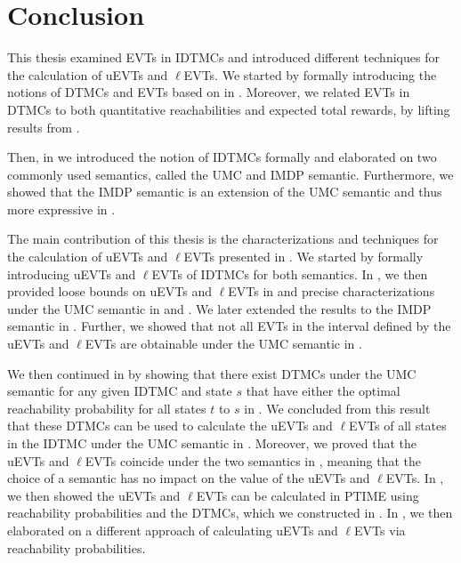 \chapter{Conclusion}
\label{ch:conclusion}
This thesis examined EVTs in IDTMCs and introduced different techniques for the calculation of uEVTs and $\ell$EVTs. We started by formally introducing the notions of DTMCs and EVTs based on \cite{Bibel,Computing_EVTs_Stationary_Distr_in_MCs_Mertens,KemenySnellBook} in . Moreover, we related EVTs in DTMCs to both quantitative reachabilities and expected total rewards, by lifting results from \cite{Baier_Relating_Reach_Prob,Computing_EVTs_Stationary_Distr_in_MCs_Mertens}.

Then, in  we introduced the notion of IDTMCs formally and elaborated on two commonly used semantics, called the UMC and IMDP semantic. Furthermore, we showed that the IMDP semantic is an extension of the UMC semantic and thus more expressive in .

The main contribution of this thesis is the characterizations and techniques for the calculation of uEVTs and $\ell$EVTs presented in . We started by formally introducing uEVTs and $\ell$EVTs of IDTMCs for both semantics. In , we then provided loose bounds on uEVTs and $\ell$EVTs in  and precise characterizations under the UMC semantic in  and . We later extended the results to the IMDP semantic in . Further, we showed that not all EVTs in the interval defined by the uEVTs and $\ell$EVTs are obtainable under the UMC semantic in . 

We then continued in  by showing that there exist DTMCs under the UMC semantic for any given IDTMC and state $s$ that have either the optimal reachability probability for all states $t$ to $s$ in . We concluded from this result that these DTMCs can be used to calculate the uEVTs and $\ell$EVTs of all states in the IDTMC under the UMC semantic in . Moreover, we proved that the uEVTs and $\ell$EVTs coincide under the two semantics in , meaning that the choice of a semantic has no impact on the value of the uEVTs and $\ell$EVTs. In , we then showed the uEVTs and $\ell$EVTs can be calculated in PTIME using reachability probabilities and the DTMCs, which we constructed in . In , we then elaborated on a different approach of calculating uEVTs and $\ell$EVTs via reachability probabilities.

